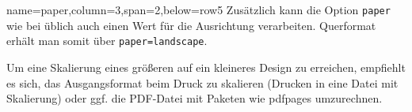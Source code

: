 \documentclass[
	accentcolor=9c,
	]{tudasciposter}
\let\code\texttt
\let\pck\textsf
\begin{document}
\begin{tcbposter}[
	poster={
		columns=4,
		rows=7,
		spacing=1cm,
	},]
\begin{posterboxenv}[title=Papierformat]{name=paper,column=3,span=2,below=row5}
	Zusätzlich kann die Option \code{paper} wie bei \KOMAScript{} üblich auch einen Wert für die Ausrichtung verarbeiten. Querformat erhält man somit über \code{paper=landscape}.

	Um eine Skalierung eines größeren auf ein kleineres Design zu erreichen, empfiehlt es sich, das Ausgangsformat beim Druck zu skalieren (Drucken in eine Datei mit Skalierung) oder ggf. die PDF-Datei mit Paketen wie \pck{pdfpages} umzurechnen.
\end{posterboxenv}

\end{tcbposter}
\end{document}
